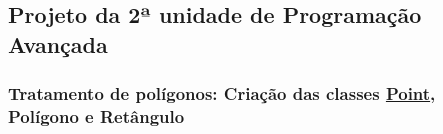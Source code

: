 \subsection*{Projeto da 2ª unidade de Programação Avançada}

\subsubsection*{Tratamento de polígonos\+: Criação das classes \mbox{\hyperlink{class_point}{Point}}, Polígono e Retângulo}